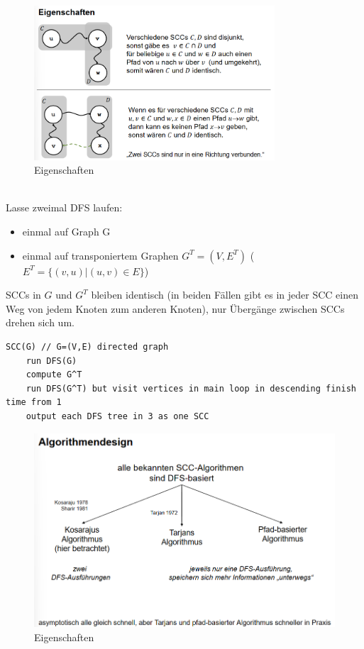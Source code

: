 \documentclass{article}
\begin{document}
                \begin{figure}[ht]
                    \centering
                    \includegraphics[width=0.8\textwidth]{Bilder/SZKEig.png}
                    \caption{Eigenschaften}
                    \label{fig:SZKEig}
                \end{figure}\\
                Lasse zweimal DFS laufen:
                \begin{itemize}
                    \item einmal auf Graph G
                    \item einmal auf transponiertem Graphen $G^T = (V,E^T)$ ($E^T=\{(v,u)|(u,v)\in E\}$)
                \end{itemize}
                SCCs in $G$ und $G^T$ bleiben identisch (in beiden Fällen gibt es in jeder SCC einen Weg von jedem Knoten zum anderen Knoten), nur Übergänge zwischen SCCs drehen sich um.
                \begin{lstlisting}[style=pseudocode]
SCC(G) // G=(V,E) directed graph
    run DFS(G)
    compute G^T
    run DFS(G^T) but visit vertices in main loop in descending finish time from 1
    output each DFS tree in 3 as one SCC
                \end{lstlisting}
                \begin{figure}[ht]
                    \centering
                    \includegraphics[width=1\textwidth]{Bilder/Algorithmendesign.png}
                    \caption{Eigenschaften}
                    \label{fig:Algorithmendesign}
                \end{figure}
\end{document}
